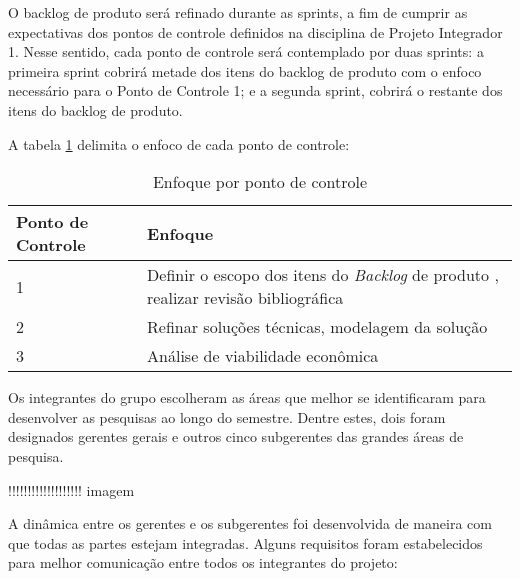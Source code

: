   O backlog de produto será refinado durante as sprints, a fim de cumprir as expectativas dos pontos de controle definidos na disciplina de Projeto Integrador 1. Nesse sentido, cada ponto de controle será contemplado por duas sprints: a primeira sprint cobrirá metade dos itens do backlog de produto com o enfoco necessário para o Ponto de Controle 1; e a segunda sprint, cobrirá o restante dos itens do backlog de produto.

  A tabela \ref{tab:enfoque_pc} delimita o enfoco de cada ponto de controle:

  \begin{table}[H]
  \centering
  \begin{tabular}{|p{4cm}|p{12cm}|}
  \hline
  Ponto de Controle & Enfoque                                                                                      \\ \hline
  1                 & Definir o escopo dos itens do \textit{Backlog} de produto , realizar revisão bibliográfica \\ \hline
  2                 & Refinar soluções técnicas, modelagem da solução                                              \\ \hline
  3                 & Análise de viabilidade econômica                                                             \\ \hline
  \end{tabular}
  \caption{Enfoque por ponto de controle}
  \label{tab:enfoque_pc}
  \end{table}

  Os integrantes do grupo escolheram as áreas que melhor se identificaram para desenvolver as pesquisas ao longo do semestre. Dentre estes, dois foram designados gerentes gerais e outros cinco subgerentes das grandes áreas de pesquisa.

  !!!!!!!!!!!!!!!!!!! imagem

  A dinâmica entre os gerentes e os subgerentes foi desenvolvida de maneira com que todas as partes estejam integradas. Alguns requisitos foram estabelecidos para melhor comunicação entre todos os integrantes do projeto:

